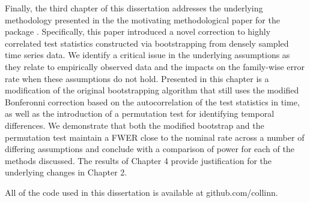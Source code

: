 Finally, the third chapter of this dissertation addresses the underlying methodology presented in the the motivating methodological paper for the  package \citep{oleson2017detecting}. Specifically, this paper introduced a novel correction to highly correlated test statistics constructed via bootstrapping from densely sampled time series data. We identify a critical issue in the underlying assumptions as they relate to empirically observed data and the impacts on the family-wise error rate when these assumptions do not hold. Presented in this chapter is a modification of the original bootstrapping algorithm that still uses the modified Bonferonni correction based on the autocorrelation of the test statistics in time, as well as the introduction of a permutation test for identifying temporal differences. We demonstrate that both the modified bootstrap and the permutation test maintain a FWER close to the nominal rate across a number of differing assumptions and conclude with a comparison of power for each of the methods discussed. The results of Chapter 4 provide justification for the underlying changes in Chapter 2. 

All of the code used in this dissertation is available at github.com/collinn.


